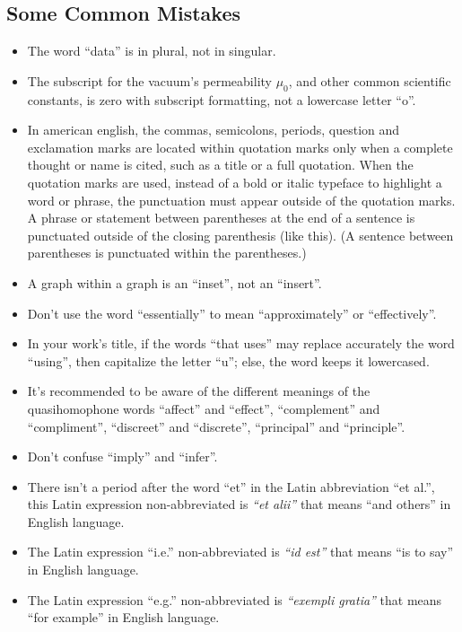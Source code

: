 \documentclass[letterpaper, 10pt, conference]{IEEEtran} %
\begin{document}
	\subsection{Some Common Mistakes}\label{subsectionSomeCommonMistakes}
	\begin{itemize}
		\item The word ``data'' is in plural, not in singular.
		\item The subscript for the vacuum's permeability $\mu_{0}$, and other common scientific constants, is zero with subscript formatting, not a lowercase letter ``o''.
		\item In american english, the commas, semicolons, periods, question and exclamation marks are located within quotation marks only when a complete thought or name is cited, such as a title or a full quotation. When the quotation marks are used, instead of a bold or italic typeface to highlight a word or phrase, the punctuation must appear outside of the quotation marks. A phrase or statement between parentheses at the end of a sentence is punctuated outside of the closing parenthesis (like this). (A sentence between parentheses is punctuated within the parentheses.)
		\item A graph within a graph is an ``inset'', not an ``insert''.
		\item Don't use the word ``essentially'' to mean ``approximately'' or ``effectively''.
		\item In your work's title, if the words ``that uses'' may replace accurately the word ``using'', then capitalize the letter ``u''; else, the word keeps it lowercased.
		\item It's recommended to be aware of the different meanings of the quasihomophone words ``affect'' and ``effect'', ``complement'' and ``compliment'', ``discreet'' and ``discrete'', ``principal'' and ``principle''.
		\item Don't confuse ``imply'' and ``infer''.
		\item There isn't a period after the word ``et'' in the Latin abbreviation ``et al.'', this Latin expression non-abbreviated is \emph{``et alii''} that means ``and others'' in English language.
		\item The Latin expression ``i.e.'' non-abbreviated is \emph{``id est''} that means ``is to say'' in English language.
		\item The Latin expression ``e.g.'' non-abbreviated is \emph{``exempli gratia''} that means ``for example'' in English language.
	\end{itemize}
	
\end{document}
